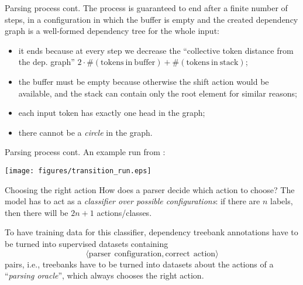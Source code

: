 \documentclass[style=upen, size=14pt]{powerdot}
\newcommand{\gold}{\color{arany}}
\theoremstyle{definition}
\begin{document}
\begin{slide}[toc=]{Parsing process cont.}
  The process is guaranteed to end after a finite number of steps, in a
  configuration in which the buffer is empty and the created dependency graph is
  a well-formed dependency tree for the whole input:
  \begin{itemize}
  \item it ends because at every step we decrease the ``collective token
    distance from the dep. graph''
    $2 \cdot \#(\mathrm{tokens~in~buffer}) + \#(\mathrm{tokens~in~stack})$;
  \item the buffer must be empty because otherwise the shift action would be
    available, and the stack can contain only the root element for similar
    reasons;
  \item each input token has exactly one head in the graph;
  \item there cannot be a \emph{circle} in the graph.
  \end{itemize}
\end{slide}

\begin{slide}[toc=]{Parsing process cont.}
  An example run from \citet[ch. 16]{jurafsky2019speech}:
  \begin{center}
        \texttt{[image: figures/transition\_run.eps]}\\
  \end{center}
\end{slide}

\begin{slide}[toc=Decision]{Choosing the right action}
  How does a parser decide which action to choose? The model has to act as a
  \emph{\gold classifier over possible configurations}: if there are $n$ labels,
  then there will be $2n+1$ actions/classes.\bigskip
  
  To have training data for this classifier, dependency treebank annotations
  have to be turned into supervised datasets containing
  $$\langle \mathrm{parser~~configuration}, \mathrm{correct~~action} \rangle$$
  pairs, i.e., treebanks have to be turned into datasets about the actions of a
  ``\emph{\gold parsing oracle}'', which always chooses the right action.
\end{slide}
\end{document}
